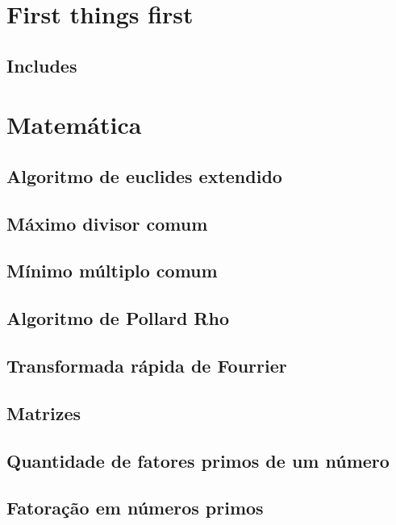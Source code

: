 \section{First things first}
\subsection{Includes}
\raggedbottom
\hrulefill
\clearpage
\section{Matemática}
\subsection{Algoritmo de euclides extendido}
\raggedbottom
\hrulefill
\subsection{Máximo divisor comum}
\raggedbottom
\hrulefill
\subsection{Mínimo múltiplo comum}
\raggedbottom
\hrulefill
\subsection{Algoritmo de Pollard Rho}
\raggedbottom
\hrulefill
\subsection{Transformada rápida de Fourrier}
\raggedbottom
\hrulefill
\subsection{Matrizes}
\raggedbottom
\hrulefill
\subsection{Quantidade de fatores primos de um número}
\raggedbottom
\hrulefill
\subsection{Fatoração em números primos}
\raggedbottom
\hrulefill

